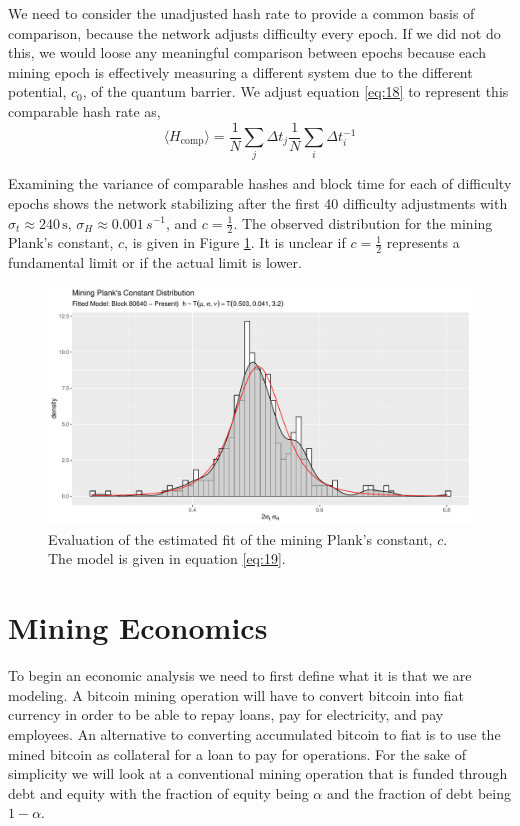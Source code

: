 \documentclass[runningheads]{llncs}
\begin{document}
We need to consider the unadjusted hash rate to provide a common basis of comparison, because the network adjusts difficulty every epoch.
If we did not do this, we would loose any meaningful comparison between epochs because each mining epoch is effectively measuring a different system due to the different potential, $c_0$, of the quantum barrier.
We adjust equation \ref{eq:18} to represent this comparable hash rate as,
\begin{equation}
    \langle H_{\textrm{comp}} \rangle = \frac{1}{N}\sum_j \Delta t_j \frac{1}{N} \sum_i \Delta t_i^{-1} \label{eq:19}
\end{equation}

Examining the variance of comparable hashes and block time for each of difficulty epochs shows the network stabilizing after the first 40 difficulty adjustments with $\sigma_t \approx 240 \, \textrm{s}$, $\sigma_H \approx 0.001\,s^{-1}$, and $c = \frac{1}{2}$.
The observed distribution for the mining Plank's constant, $c$, is given in Figure \ref{fig:9}.
It is unclear if $c = \frac{1}{2}$ represents a fundamental limit or if the actual limit is lower. 
\begin{figure}
    \includegraphics[width=\textwidth]{hbar Fit.pdf}
    \caption{Evaluation of the estimated fit of the mining Plank's constant, $c$.
        The model is given in equation \ref{eq:19}.} \label{fig:9}
\end{figure}
\section{Mining Economics}
To begin an economic analysis we need to first define what it is that we are modeling.
A bitcoin mining operation will have to convert bitcoin into fiat currency in order to be able to repay loans, pay for electricity, and pay employees.
An alternative to converting accumulated bitcoin to fiat is to use the mined bitcoin as collateral for a loan to pay for operations.
For the sake of simplicity we will look at a conventional mining operation that is funded through debt and equity with the fraction of equity being $\alpha$ and the fraction of debt being $1 - \alpha$.
\end{document}
